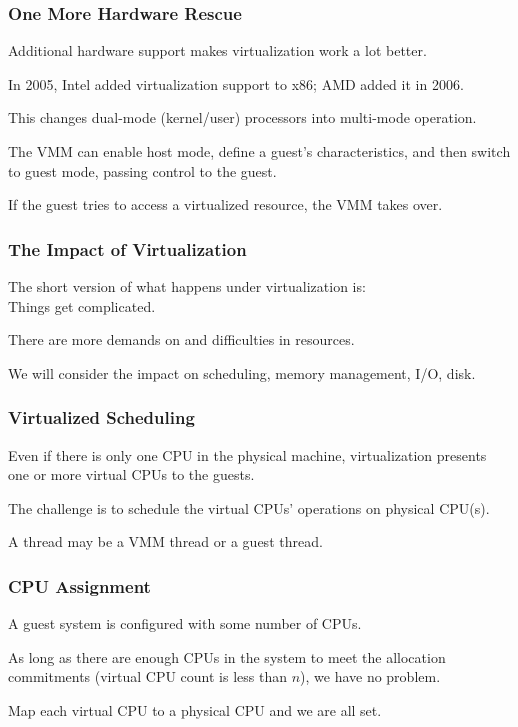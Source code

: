 \begin{frame}
\frametitle{One More Hardware Rescue}

Additional hardware support makes virtualization work a lot better.

In 2005, Intel added virtualization support to x86; AMD added it in 2006. 

This changes dual-mode (kernel/user) processors into multi-mode operation. 

The VMM can enable host mode, define a guest's characteristics, and then switch to guest mode, passing control to the guest. 

If the guest tries to access a virtualized resource, the VMM takes over.


\end{frame}

\begin{frame}
\frametitle{The Impact of Virtualization}

The short version of what happens under virtualization is:\\
\quad Things get complicated. 

There are more demands on and difficulties in resources. 

We will consider the impact on scheduling, memory management, I/O, disk.

\end{frame}

\begin{frame}
\frametitle{Virtualized Scheduling}

Even if there is only one CPU in the physical machine, virtualization presents one or more virtual CPUs to the guests. 

The challenge is to schedule the virtual CPUs' operations on physical CPU(s). 

A thread may be a VMM thread or a guest thread.

\end{frame}



\begin{frame}
\frametitle{CPU Assignment}


A guest system is configured with some number of CPUs.

As long as there are enough CPUs in the system to meet the allocation commitments (virtual CPU count is less than $n$), we have no problem. 


Map each virtual CPU to a physical CPU and we are all set. 

\end{frame}

